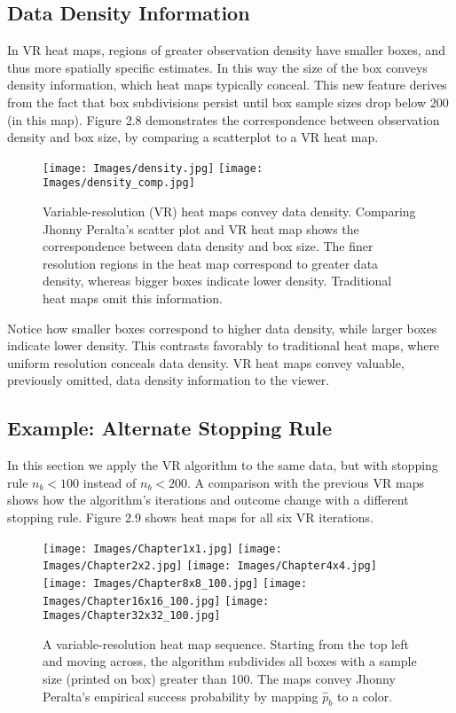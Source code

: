 \subsection{Data Density Information}

In VR heat maps, regions of greater observation density have smaller boxes, and thus more spatially specific estimates. In this way the size of the box conveys density information, which heat maps typically conceal. This new feature derives from the fact that box subdivisions persist until box sample sizes drop below 200 (in this map). Figure 2.8 demonstrates the correspondence between observation density and box size, by comparing a scatterplot to a VR heat map. 
        \begin{figure}[H]
      	\centering
      	\texttt{[image: Images/density.jpg]}
      	\texttt{[image: Images/density\_comp.jpg]} 
      	\caption{Variable-resolution (VR) heat maps convey data density. Comparing Jhonny Peralta's scatter plot and VR heat map shows the correspondence between data density and box size. The finer resolution regions in the heat map correspond to greater data density, whereas bigger boxes indicate lower density. Traditional heat maps omit this information.}
      	\end{figure}
Notice how smaller boxes correspond to higher data density, while larger boxes indicate lower density. This contrasts favorably to traditional heat maps, where uniform resolution conceals data density. VR heat maps convey valuable, previously omitted, data density information to the viewer. 
      	
\subsection{Example: Alternate Stopping Rule} %
      	
In this section we apply the VR algorithm to the same data, but with stopping rule $n_{b} < 100$ instead of $n_{b} < 200$. A comparison with the previous VR maps shows how the algorithm's iterations and outcome change with a different stopping rule. Figure 2.9 shows heat maps for all six VR iterations.
        \begin{figure}[H]
      	\centering
      	\texttt{[image: Images/Chapter1x1.jpg]}
      	\texttt{[image: Images/Chapter2x2.jpg]}
      	\texttt{[image: Images/Chapter4x4.jpg]}
      	\texttt{[image: Images/Chapter8x8\_100.jpg]}
      	\texttt{[image: Images/Chapter16x16\_100.jpg]}
      	\texttt{[image: Images/Chapter32x32\_100.jpg]}
      	\caption{A variable-resolution heat map sequence. Starting from the top left and moving across, the algorithm subdivides all boxes with a sample size (printed on box) greater than 100. The maps convey Jhonny Peralta's empirical success probability by mapping $\hat{p}_{b}$ to a color.}
\end{figure} 	

